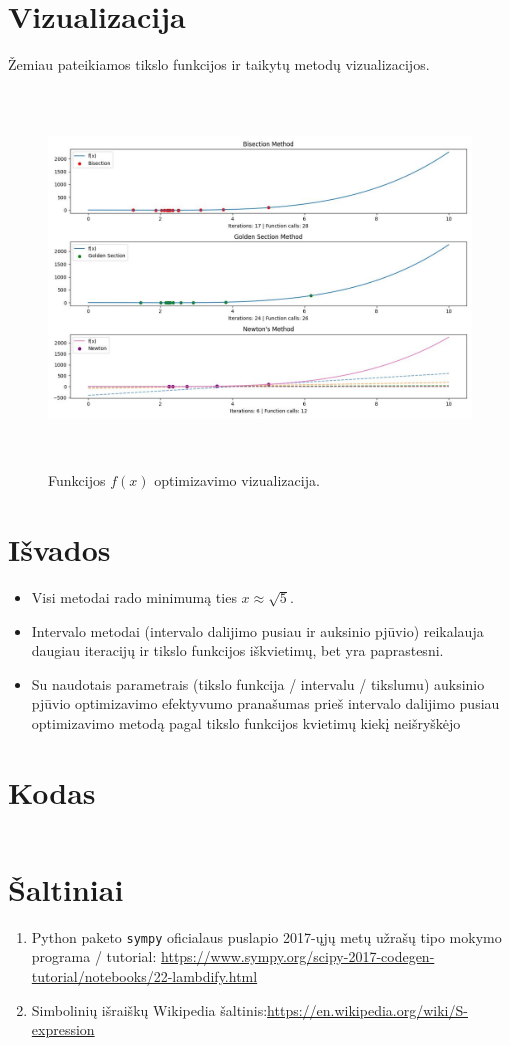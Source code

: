 \documentclass[lithuanian,a4paper,12pt]{article}
\begin{document}
\section{Vizualizacija}
Žemiau pateikiamos tikslo funkcijos ir taikytų metodų vizualizacijos.

\begin{figure}[H]
    \centering
    \includegraphics[width=\textwidth,height=10cm]{figure-1.jpeg}
    \caption{\label{fig:all}Funkcijos $f(x)$ optimizavimo vizualizacija.}
\end{figure}

\section{Išvados}
\begin{itemize}
    \item Visi metodai rado minimumą ties $x \approx \sqrt{5}$.
    \item Intervalo metodai (intervalo dalijimo pusiau ir auksinio pjūvio) reikalauja daugiau iteracijų ir tikslo funkcijos iškvietimų, bet yra paprastesni.
    \item Su naudotais parametrais (tikslo funkcija / intervalu / tikslumu) auksinio pjūvio optimizavimo efektyvumo pranašumas prieš intervalo dalijimo pusiau optimizavimo metodą pagal tikslo funkcijos kvietimų kiekį neišryškėjo
\end{itemize}

\section{Kodas}
\inputminted{python}{../code/main.py}
\section{Šaltiniai}

\begin{enumerate}
    \item Python paketo \texttt{sympy} oficialaus puslapio 2017-ųjų metų užrašų tipo mokymo programa / tutorial: \url{https://www.sympy.org/scipy-2017-codegen-tutorial/notebooks/22-lambdify.html}
    \item Simbolinių išraiškų Wikipedia šaltinis:\url{https://en.wikipedia.org/wiki/S-expression}
\end{enumerate}
\end{document}
